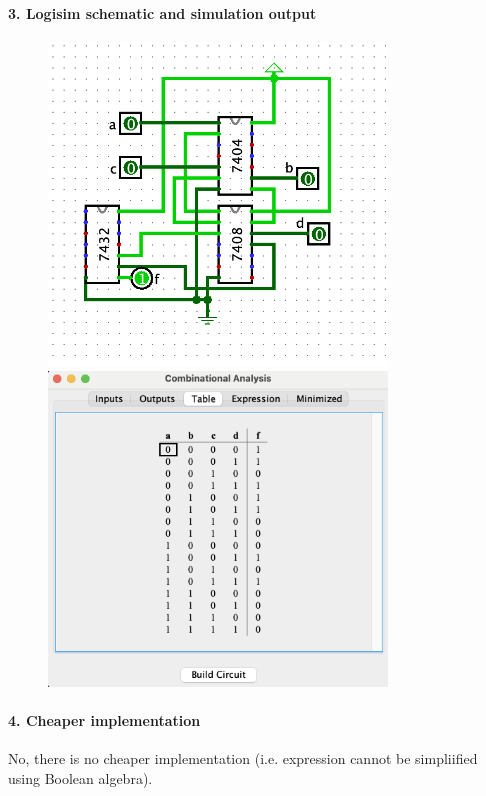 \documentclass[12pt, tikz]{scrartcl}
\begin{document}
\newpage
\paragraph*{3. Logisim schematic and simulation output} \hfill \newline
\begin{figure}[hp]
\begin{center}
\includegraphics[width=9cm]{q22.png}
\includegraphics[width=9cm]{q21.png}
\end{center}
\end{figure}

\paragraph*{4. Cheaper implementation} \hfill \newline
No, there is no cheaper implementation (i.e. expression cannot be simpliified using Boolean algebra).
\end{document}
